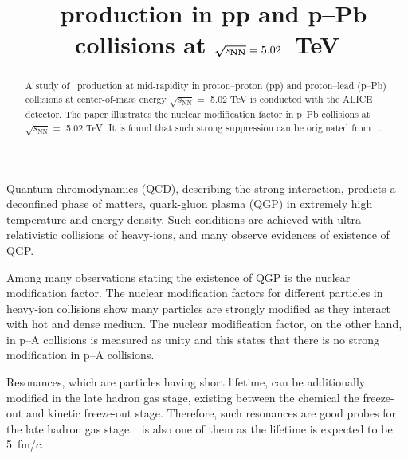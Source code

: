 \documentclass[ALICE,manyauthors]{cernphprep}
\begin{document}
\begin{titlepage}

\PHyear{}
\PHdate{\today}
%

\title{\fzero\ production in pp and p--Pb collisions at $\boldsymbol{\sqrt{{\textit s_\mathrm{NN}}}}=5.02$~TeV}
\ShortTitle{}   %


\begin{abstract}
A study of \fzero~production at mid-rapidity in proton--proton (pp) and proton--lead (p--Pb) collisions at center-of-mass energy $\sqrt{s_{\mathrm{NN}}} = $ 5.02 TeV is conducted with the ALICE detector. The paper illustrates the nuclear modification factor in p--Pb collisions at $\sqrt{s_{\mathrm{NN}}}=$ 5.02 TeV. It is found that such strong suppression can be originated from ...
\end{abstract}

\end{titlepage}

\setcounter{page}{2}

%
%
%
%

Quantum chromodynamics (QCD), describing the strong interaction, predicts a deconfined phase of matters, quark-gluon plasma (QGP) in extremely high temperature and energy density. Such conditions are achieved with ultra-relativistic collisions of heavy-ions, and many observe evidences of existence of QGP.

Among many observations stating the existence of QGP is the nuclear modification factor. The nuclear modification factors for different particles in heavy-ion collisions show many particles are strongly modified as they interact with hot and dense medium. The nuclear modification factor, on the other hand, in p--A collisions is measured as unity and this states that there is no strong modification in p--A collisions.

Resonances, which are particles having short lifetime, can be additionally modified in the late hadron gas stage, existing between the chemical the freeze-out and kinetic freeze-out stage. Therefore, such resonances are good probes for the late hadron gas stage. \fzero~is also one of them as the lifetime is expected to be 5~fm/$c$.
\end{document}

